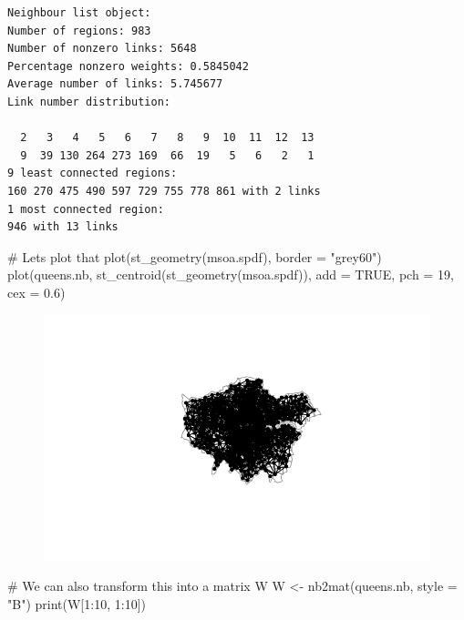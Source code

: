 \documentclass[
  letterpaper,
  DIV=11,
  numbers=noendperiod]{scrreprt}
\newenvironment{Shaded}{\begin{snugshade}}{\end{snugshade}}
\newcommand{\AttributeTok}[1]{\textcolor[rgb]{0.40,0.45,0.13}{#1}}
\newcommand{\CommentTok}[1]{\textcolor[rgb]{0.37,0.37,0.37}{#1}}
\newcommand{\ConstantTok}[1]{\textcolor[rgb]{0.56,0.35,0.01}{#1}}
\newcommand{\DecValTok}[1]{\textcolor[rgb]{0.68,0.00,0.00}{#1}}
\newcommand{\FloatTok}[1]{\textcolor[rgb]{0.68,0.00,0.00}{#1}}
\newcommand{\FunctionTok}[1]{\textcolor[rgb]{0.28,0.35,0.67}{#1}}
\newcommand{\NormalTok}[1]{\textcolor[rgb]{0.00,0.23,0.31}{#1}}
\newcommand{\OtherTok}[1]{\textcolor[rgb]{0.00,0.23,0.31}{#1}}
\newcommand{\SpecialCharTok}[1]{\textcolor[rgb]{0.37,0.37,0.37}{#1}}
\newcommand{\StringTok}[1]{\textcolor[rgb]{0.13,0.47,0.30}{#1}}
\begin{document}
\begin{verbatim}
Neighbour list object:
Number of regions: 983 
Number of nonzero links: 5648 
Percentage nonzero weights: 0.5845042 
Average number of links: 5.745677 
Link number distribution:

  2   3   4   5   6   7   8   9  10  11  12  13 
  9  39 130 264 273 169  66  19   5   6   2   1 
9 least connected regions:
160 270 475 490 597 729 755 778 861 with 2 links
1 most connected region:
946 with 13 links
\end{verbatim}

\begin{Shaded}
\begin{Highlighting}[]
\CommentTok{\# Lets plot that}
\FunctionTok{plot}\NormalTok{(}\FunctionTok{st\_geometry}\NormalTok{(msoa.spdf), }\AttributeTok{border =} \StringTok{"grey60"}\NormalTok{)}
\FunctionTok{plot}\NormalTok{(queens.nb, }\FunctionTok{st\_centroid}\NormalTok{(}\FunctionTok{st\_geometry}\NormalTok{(msoa.spdf)), }
     \AttributeTok{add =} \ConstantTok{TRUE}\NormalTok{, }\AttributeTok{pch =} \DecValTok{19}\NormalTok{, }\AttributeTok{cex =} \FloatTok{0.6}\NormalTok{)}
\end{Highlighting}
\end{Shaded}

\begin{figure}[H]

{\centering \includegraphics{03_weights_files/figure-pdf/unnamed-chunk-4-1.pdf}

}

\end{figure}

\begin{Shaded}
\begin{Highlighting}[]
\CommentTok{\# We can also transform this into a matrix W}
\NormalTok{W }\OtherTok{\textless{}{-}} \FunctionTok{nb2mat}\NormalTok{(queens.nb, }\AttributeTok{style =} \StringTok{"B"}\NormalTok{)}
\FunctionTok{print}\NormalTok{(W[}\DecValTok{1}\SpecialCharTok{:}\DecValTok{10}\NormalTok{, }\DecValTok{1}\SpecialCharTok{:}\DecValTok{10}\NormalTok{])}
\end{Highlighting}
\end{Shaded}
\end{document}
